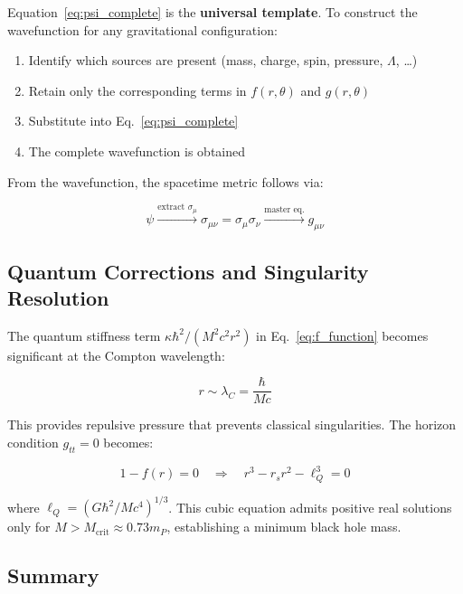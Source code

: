 \documentclass[11pt,a4paper]{article}
\theoremstyle{definition}
\theoremstyle{remark}
\begin{document}
	Equation~\eqref{eq:psi_complete} is the \textbf{universal template}. To construct the wavefunction for any gravitational configuration:
	
	\begin{enumerate}
		\item Identify which sources are present (mass, charge, spin, pressure, $\Lambda$, \ldots)
		\item Retain only the corresponding terms in $f(r,\theta)$ and $g(r,\theta)$
		\item Substitute into Eq.~\eqref{eq:psi_complete}
		\item The complete wavefunction is obtained
	\end{enumerate}
	
	From the wavefunction, the spacetime metric follows via:
	
	\begin{equation}
		\psi \xrightarrow{\text{extract } \sigma_\mu} \sigma_{\mu\nu} = \sigma_\mu\sigma_\nu \xrightarrow{\text{master eq.}} g_{\mu\nu}
	\end{equation}
	
	\subsection{Quantum Corrections and Singularity Resolution}
	
	The quantum stiffness term $\kappa\hbar^2/(M^2c^2r^2)$ in Eq.~\eqref{eq:f_function} becomes significant at the Compton wavelength:
	
	\begin{equation}
		r \sim \lambda_C = \frac{\hbar}{Mc}
	\end{equation}
	
	This provides repulsive pressure that prevents classical singularities. The horizon condition $g_{tt} = 0$ becomes:
	
	\begin{equation}
		1 - f(r) = 0 \quad \Rightarrow \quad r^3 - r_s r^2 - \ell_Q^3 = 0
		\label{eq:horizon_quantum}
	\end{equation}
	
	where $\ell_Q = (G\hbar^2/Mc^4)^{1/3}$. This cubic equation admits positive real solutions only for $M > M_{\text{crit}} \approx 0.73 m_P$, establishing a minimum black hole mass.
	
	\subsection{Summary}
	
\end{document}
